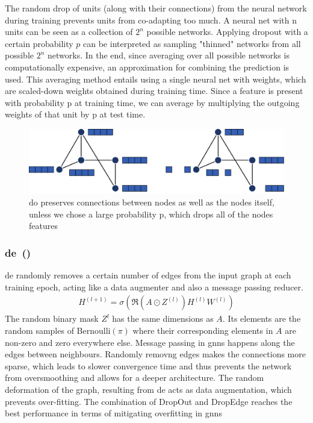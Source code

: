 The random drop of units (along with their connections) from the neural
network during training prevents units from co-adapting too much.
A neural net with n units can be seen as a collection of $2^{n}$ possible networks.
Applying dropout with a certain probability $p$ can be interpreted as sampling
"thinned" networks from all possible $2^{n}$ networks. In the end, since averaging over
all possible networks is computationally expensive, an approximation for
combining the prediction is used. This averaging method entails using
a single neural net with weights, which are scaled-down weights obtained during
training time. Since a feature is present with probability p at training time,
we can average by multiplying the outgoing weights of that unit by p at test time.
\begin{figure}[ht]
    \centering
    \includegraphics[width= 0.90\linewidth]{gfx/related-work/DropOut}
    \caption{\acf{do} preserves connections between nodes as well as the
        nodes itself, unless we chose a large probability p, which drops all of the nodes
        features}\label{fig:related:DropOut}
\end{figure}
\subsubsection{\acl*{de}~(\citeauthor{Rong2020})}
\label{sec:related:pred:regularization:de}


\ac{de} randomly removes a
certain number of edges from the input graph at each training epoch, acting like a
data augmenter and also a message passing reducer.
\begin{align*}
    H^{(l+1)} = \sigma(\mathfrak{R}(A \odot Z^{(l)}) H^{(l)} W^{(l)})
\end{align*}
The random binary mask $Z^{l}$ has the same dimensions as $A$.
Its elements are the random samples of Bernoulli$(\pi)$ where their
corresponding elements in $A$ are non-zero and zero everywhere else.
Message passing in \acp{gnn} happens along the edges between neighbours.
Randomly removng edges makes the connections more sparse, which
leads to slower convergence time and thus prevents the
network from oversmoothing and allows for a deeper architecture.
The random deformation of the graph, resulting from \ac{de} acts as
data augmentation, which prevents over-fitting.
The combination of DropOut and DropEdge reaches the best performance in
terms of mitigating overfitting in \acp{gnn}

